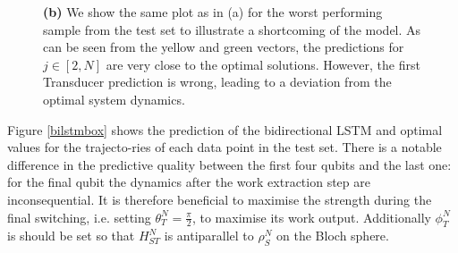 \begin{figure}
{	\textbf{(b)} We show the same plot as in (a) for the worst performing sample from the test set to illustrate a shortcoming of the model. As can be seen from the yellow and green vectors, the predictions for $j \in [2, N]$ are very close to the optimal solutions. However, the first Transducer prediction is wrong, leading to a deviation from the optimal system dynamics.}
	\label{n_5_blochs}
\end{figure}


Figure \ref{bilstmbox} shows the prediction of the bidirectional LSTM and optimal values for the trajecto-ries of each data point in the test set.
There is a notable difference in the predictive quality between the first four qubits and the last one: for the final qubit the dynamics after the work extraction step are inconsequential.
It is therefore beneficial to maximise the strength during the final switching, i.e. setting $\theta_T^N = \frac{\pi}{2}$, to maximise its work output.
Additionally $\phi_T^N$ is should be set so that $H_{ST}^N$ is antiparallel to $\rho_S^N$ on the Bloch sphere.



